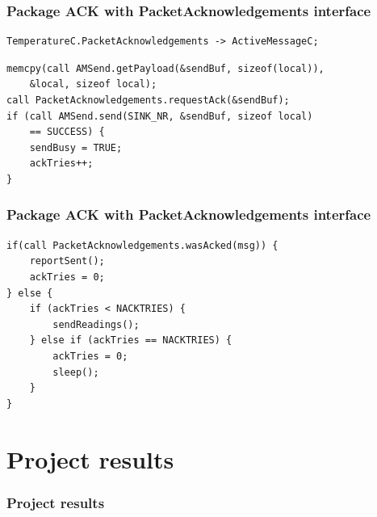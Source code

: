 \documentclass{beamer}
\begin{document}
\begin{frame}[fragile]
\frametitle{Package ACK with PacketAcknowledgements interface}
\begin{lstlisting}[caption={TemperatureAppC.nc}]
 TemperatureC.PacketAcknowledgements -> ActiveMessageC;
\end{lstlisting}


\begin{lstlisting}[caption={TemperatureC.nc $\rightarrow$ sendReadings()}]
memcpy(call AMSend.getPayload(&sendBuf, sizeof(local)),
    &local, sizeof local);
call PacketAcknowledgements.requestAck(&sendBuf);
if (call AMSend.send(SINK_NR, &sendBuf, sizeof local)
    == SUCCESS) {
    sendBusy = TRUE;
    ackTries++;
}
\end{lstlisting}

\end{frame}

\begin{frame}[fragile]
\frametitle{Package ACK with PacketAcknowledgements interface}

\begin{lstlisting}[caption={TemperatureC.nc $\rightarrow$ AMSend.sendDone()}]
if(call PacketAcknowledgements.wasAcked(msg)) {
    reportSent();
    ackTries = 0;
} else {
    if (ackTries < NACKTRIES) {
        sendReadings();
    } else if (ackTries == NACKTRIES) {
        ackTries = 0;
        sleep();
    }
}
\end{lstlisting}

\end{frame}


\section{Project results}

\begin{frame}
\frametitle{Project results}
 
\end{frame}
\end{document}
